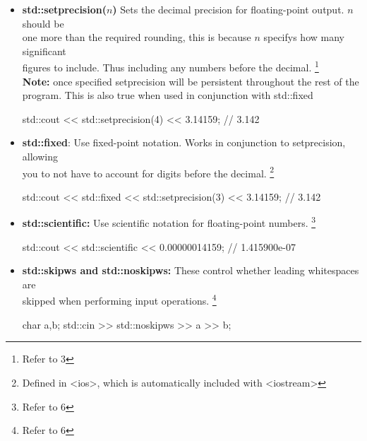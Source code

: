 \documentclass{report}
\begin{document}
\begin{itemize}
        \item \textbf{std::setprecision($n$)} Sets the decimal precision for floating-point output. $n$ should be  \\ one more than the required rounding, this is because $n$ specifys how many significant  \\ figures to include. Thus including any numbers before the decimal. \footnote{Refer to 3} \\
            \textbf{Note:} once specified setprecision will be persistent throughout the rest of the program. This is also true when used in conjunction with std::fixed

            \smallbreak
            
            \begin{cppcode}
            std::cout << std::setprecision(4) << 3.14159; // 3.142
            \end{cppcode}
            
            \pagebreak \bigbreak \noindent 
        \item \textbf{std::fixed}: Use fixed-point notation. Works in conjunction to setprecision, allowing \\ you to not have to account for digits before the decimal.  \footnote{Defined in <ios>, which is automatically included with <iostream>}
            \smallbreak
            
            \begin{cppcode}
            std::cout << std::fixed << std::setprecision(3) << 3.14159; 
            // 3.142
            \end{cppcode}
            
        \item \textbf{std::scientific:} Use scientific notation for floating-point numbers. \footnote{Refer to 6}
            \smallbreak
            
            \begin{cppcode}
            std::cout << std::scientific << 0.00000014159; 
            // 1.415900e-07 
            \end{cppcode}
            
        \item \textbf{std::skipws and std::noskipws:} These control whether leading whitespaces are \\ skipped when performing input operations. \footnote{Refer to 6}
            \smallbreak
            
            \begin{cppcode}
            char a,b;
            std::cin >> std::noskipws >> a >> b;
            \end{cppcode}
            

\end{itemize}
\end{document}
